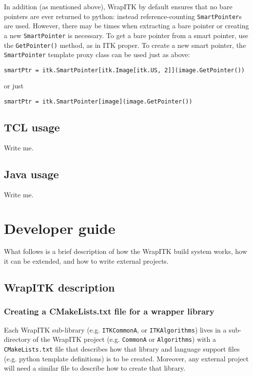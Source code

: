 \documentclass{InsightArticle}
\begin{document}
In addition (as mentioned above), WrapITK by default ensures that no bare
pointers are ever returned to python: instead reference-counting \verb$SmartPointer$s
are used. However, there may be times when extracting a bare pointer or creating
a new \verb$SmartPointer$ is necessary. To get a bare pointer from a smart pointer, use
the \verb$GetPointer()$ method, as in ITK proper. To create a new smart pointer, the
\verb$SmartPointer$ template proxy class can be used just as above:
\small \begin{verbatim}
smartPtr = itk.SmartPointer[itk.Image[itk.US, 2]](image.GetPointer())
\end{verbatim} \normalsize
or just
\small \begin{verbatim}
smartPtr = itk.SmartPointer[image](image.GetPointer())
\end{verbatim} \normalsize

    \subsection{TCL usage}

Write me.

    \subsection{Java usage}

Write me.

\section{Developer guide}

What follows is a brief description of how the WrapITK build system works, how
it can be extended, and how to write external projects.

  \subsection{WrapITK description}

     \subsubsection{Creating a CMakeLists.txt file for a wrapper library}
Each WrapITK sub-library (e.g. \verb$ITKCommonA$, or \verb$ITKAlgorithms$) lives in a
sub-directory of the WrapITK project (e.g. \verb$CommonA$ or \verb$Algorithms$) with a
\verb$CMakeLists.txt$ file that describes how that library  and language support files
(e.g. python template definitions) is to be created. Moreover, any external
project will need a similar file to describe how to create that library.
\end{document}

